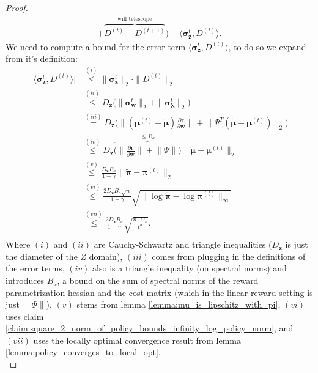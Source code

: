 \begin{proof}
\begin{align*}
         + \overbrace{D^{(t)} - D^{(t+1)}}^\text{will telescope}
     \Big) 
    - \langle \bm{\sigma}_{\bm{z}}^{t}, D^{(t)} \rangle.
\end{align*}
We need to compute a bound for the error term $\langle \bm{\sigma}_{\bm{z}}^{t}, D^{(t)} \rangle$, to do so we expand from it's definition:
\begin{align*}
   \Big| \langle \bm{\sigma}_{\bm{z}}^{t}, D^{(t)} \rangle  \Big|
    &\stackrel{(i)}{\leq}  \|\bm{\sigma}_{\bm{z}}^{t} \|_2 \cdot \| D^{(t)}\|_2\\
    &\stackrel{(ii)}{\leq} D_{\bm{z}} \big(\|\bm{\sigma}_{\bm{w}}^{t} \|_2 + \|\bm{\sigma}_{\bm{\lambda}}^{t} \|_2 \big) \\
    &\stackrel{(iii)}{=} D_{\bm{z}} \Big(
        \Big\|
            (\bm{\mu}^{(t)} - \tilde{\bm{\mu}}) 
            \frac{\partial \bm{r}}{\partial \bm{w}}
        \Big\|
        + \Big\|
            \Psi^T (\tilde{\bm{\mu}}- \bm{\mu}^{(t)})
        \Big\|_2 \Big)\\
    &\stackrel{(iv)}{\leq} D_{\bm{z}} \overbrace{\Big(
        \Big\|
            \frac{\partial \bm{r}}{\partial \bm{w}}
        \Big\|
        + \big\|
            \Psi
        \big\| \Big)}^{
        \leq B_a
        } \| \tilde{\bm{\mu}} - \bm{\mu}^{(t)}\|_2\\
    &\stackrel{(v)}{\leq} 
    \frac{D_{\bm{z}} B_a}{1 - \gamma}
    \| \tilde{\bm{\pi}} - \bm{\pi}^{(t)}\|_2 
    \\
    &\stackrel{(vi)}{\leq}
    \frac{2 D_{\bm{z}} B_a \sqrt{n}}{1 - \gamma}
    \sqrt{\| \log \tilde{\bm{\pi}} - \log \bm{\pi}^{(t)}\|_\infty} \\
    &\stackrel{(vii)}{\leq} 
    \frac{2 D_{\bm{z}} B_a}{1 - \gamma}
    \sqrt{\frac{n \cdot C_\pi}{t^{u}}}. \\
\end{align*}
Where $(i)$ and $(ii)$ are Cauchy-Schwartz and triangle inequalities ($D_{\bm{z}}$ is just the diameter of the $Z$ domain), $(iii)$ comes from plugging in the definitions of the error terms, $(iv)$ also is a triangle inequality (on spectral norms) and introduces $B_a$, a bound on the sum of spectral norms of the reward parametrization hessian and the cost matrix (which in the linear reward setting is just $\|\Phi\|$), $(v)$ stems from lemma \ref{lemma:mu_is_lipschitz_with_pi}, $(vi)$ uses claim \ref{claim:square_2_norm_of_policy_bounds_infinity_log_policy_norm}, and $(vii)$ uses the locally optimal convergence result from lemma \ref{lemma:policy_converges_to_local_opt}. \\


\end{proof}
